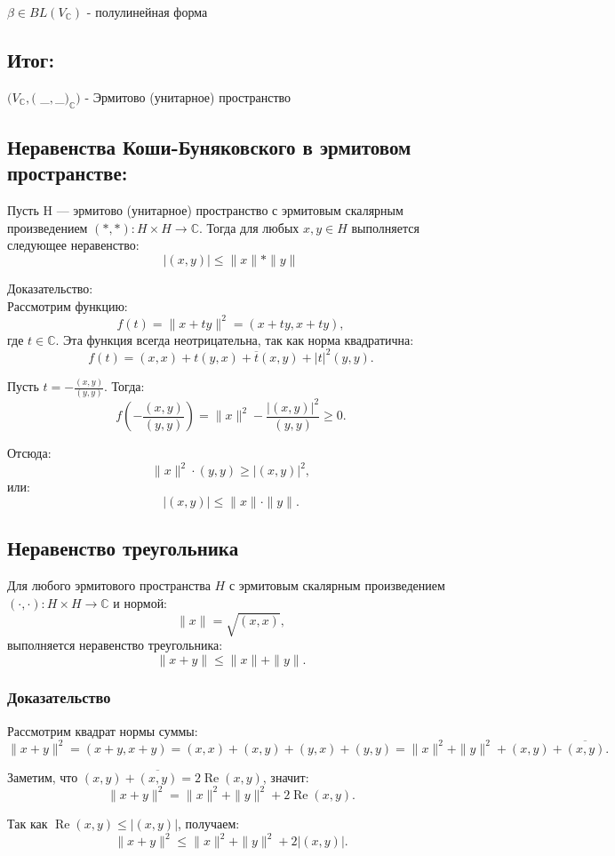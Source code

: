 \documentclass[12pt]{article}
\begin{document}
$\beta \in BL(V_\mathbb{C})$ - полулинейная форма

\subsection*{Итог:}
$(V_\mathbb{C}, (  $ _$ , $_$ )_\mathbb{C})$ - Эрмитово (унитарное) пространство

\subsection{Неравенства Коши-Буняковского в  эрмитовом пространстве:}

Пусть H — эрмитово (унитарное) пространство с эрмитовым скалярным произведением $(*, *) : H\times H \to \mathbb{C}.$ Тогда для любых $x, y \in H$ выполняется следующее неравенство:
\[
|(x,y)| \leq \|x\| * \|y\|
\]

Доказательство:
\[\]
Рассмотрим функцию:
\[
f(t) = \|x + ty\|^2 = (x + ty, x + ty),
\]
где $t \in \mathbb{C}$. Эта функция всегда неотрицательна, так как норма квадратична:
\[
f(t) = (x, x) + t(y, x) + \overline{t}(x, y) + |t|^2(y, y).
\]

Пусть $t = -\frac{(x, y)}{(y, y)}$. Тогда:
\[
f\left(-\frac{(x, y)}{(y, y)}\right) = \|x\|^2 - \frac{|(x, y)|^2}{(y, y)} \geq 0.
\]

Отсюда:
\[
\|x\|^2 \cdot (y, y) \geq |(x, y)|^2,
\]
или:
\[
|(x, y)| \leq \|x\| \cdot \|y\|.
\]

\subsection*{Неравенство треугольника}

Для любого эрмитового пространства $H$ с эрмитовым скалярным произведением $(\cdot, \cdot): H \times H \to \mathbb{C}$ и нормой:
\[
\|x\| = \sqrt{(x, x)},
\]
выполняется неравенство треугольника:
\[
\|x + y\| \leq \|x\| + \|y\|.
\]

\subsubsection{Доказательство}
Рассмотрим квадрат нормы суммы:
\[
\|x + y\|^2 = (x + y, x + y) = (x, x) + (x, y) + (y, x) + (y, y) = \|x\|^2 + \|y\|^2 + (x, y) + \overline{(x, y)}.
\]

Заметим, что $(x, y) + \overline{(x, y)} = 2 \operatorname{Re}(x, y)$, значит:
\[
\|x + y\|^2 = \|x\|^2 + \|y\|^2 + 2 \operatorname{Re}(x, y).
\]

Так как $\operatorname{Re}(x, y) \leq |(x, y)|$, получаем:
\[
\|x + y\|^2 \leq \|x\|^2 + \|y\|^2 + 2 |(x, y)|.
\]
\end{document}
